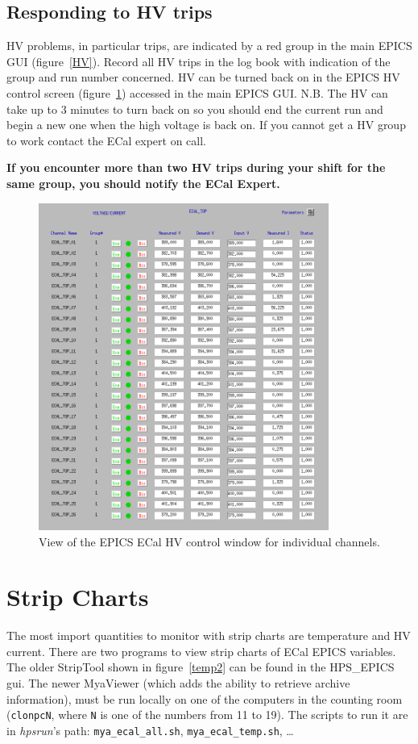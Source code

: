 \documentclass[12pt]{article}
\begin{document}
   \subsection{Responding to HV trips}

      HV problems, in particular trips, are indicated by a red group in the main EPICS GUI (figure~\ref{HV}). Record all HV trips in the log book with indication of the group and run number concerned. HV can be turned back on in the EPICS HV control screen (figure~\ref{HVControl}) accessed in the main EPICS GUI. N.B. The HV can take up to 3 minutes to turn back on so you should end the current run and begin a new one when the high voltage is back on. If you cannot get a HV group to work contact the ECal expert on call.

      {\bf If you encounter more than two HV trips during your shift for the same group, you should notify the ECal Expert.}

\begin{figure}[htbp]
\center
\includegraphics[width=0.85\textwidth]{pics/ecalhv_setting_2014_12_15.png}
\caption{\small \label{HVControl} View of the EPICS ECal HV control window for individual channels.}
\end{figure}

  \section{Strip Charts}
      The most import quantities to monitor with strip charts are temperature and HV current.  There are two programs to view strip charts of ECal EPICS variables.  The older StripTool shown in figure~\ref{temp2} can be found in the HPS\_EPICS gui.  The newer MyaViewer (which adds the ability to retrieve archive information), must be run locally on one of the computers in the counting room (\texttt{clonpcN}, where \texttt{N} is one of the numbers from 11 to 19).  The scripts to run it are in {\it hpsrun}'s path: \texttt{mya\_ecal\_all.sh}, \texttt{mya\_ecal\_temp.sh}, \ldots
\end{document}
